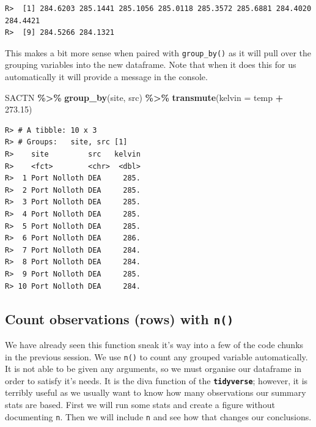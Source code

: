 \documentclass[
]{book}
\newenvironment{Shaded}{\begin{snugshade}}{\end{snugshade}}
\newcommand{\DataTypeTok}[1]{\textcolor[rgb]{0.13,0.29,0.53}{#1}}
\newcommand{\FloatTok}[1]{\textcolor[rgb]{0.00,0.00,0.81}{#1}}
\newcommand{\KeywordTok}[1]{\textcolor[rgb]{0.13,0.29,0.53}{\textbf{#1}}}
\newcommand{\NormalTok}[1]{#1}
\newcommand{\OperatorTok}[1]{\textcolor[rgb]{0.81,0.36,0.00}{\textbf{#1}}}
\newcommand{\StringTok}[1]{\textcolor[rgb]{0.31,0.60,0.02}{#1}}
\begin{document}
\begin{verbatim}
R>  [1] 284.6203 285.1441 285.1056 285.0118 285.3572 285.6881 284.4020 284.4421
R>  [9] 284.5266 284.1321
\end{verbatim}

This makes a bit more sense when paired with \texttt{group\_by()} as it will pull over the grouping variables into the new dataframe. Note that when it does this for us automatically it will provide a message in the console.

\begin{Shaded}
\begin{Highlighting}[]
\NormalTok{SACTN }\OperatorTok{\%>\%}\StringTok{ }
\StringTok{  }\KeywordTok{group\_by}\NormalTok{(site, src) }\OperatorTok{\%>\%}\StringTok{ }
\StringTok{  }\KeywordTok{transmute}\NormalTok{(}\DataTypeTok{kelvin =}\NormalTok{ temp }\OperatorTok{+}\StringTok{ }\FloatTok{273.15}\NormalTok{)}
\end{Highlighting}
\end{Shaded}

\begin{verbatim}
R> # A tibble: 10 x 3
R> # Groups:   site, src [1]
R>    site         src   kelvin
R>    <fct>        <chr>  <dbl>
R>  1 Port Nolloth DEA     285.
R>  2 Port Nolloth DEA     285.
R>  3 Port Nolloth DEA     285.
R>  4 Port Nolloth DEA     285.
R>  5 Port Nolloth DEA     285.
R>  6 Port Nolloth DEA     286.
R>  7 Port Nolloth DEA     284.
R>  8 Port Nolloth DEA     284.
R>  9 Port Nolloth DEA     285.
R> 10 Port Nolloth DEA     284.
\end{verbatim}

\hypertarget{count-observations-rows-with-n}{%
\subsection{\texorpdfstring{Count observations (rows) with \texttt{n()}}{Count observations (rows) with n()}}\label{count-observations-rows-with-n}}

We have already seen this function sneak it's way into a few of the code chunks in the previous session. We use \texttt{n()} to count any grouped variable automatically. It is not able to be given any arguments, so we must organise our dataframe in order to satisfy it's needs. It is the diva function of the \textbf{\texttt{tidyverse}}; however, it is terribly useful as we usually want to know how many observations our summary stats are based. First we will run some stats and create a figure without documenting \texttt{n}. Then we will include \texttt{n} and see how that changes our conclusions.
\end{document}

